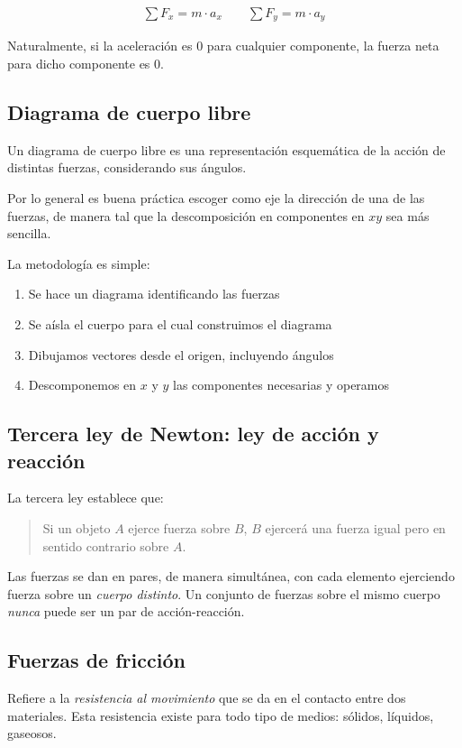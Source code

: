 \begin{align*}
    \sum F_x = m \cdot a_x \qquad \sum F_y = m \cdot a_y
\end{align*}

Naturalmente, si la aceleración es 0 para cualquier componente,
la fuerza neta para dicho componente es 0.

\subsection{Diagrama de cuerpo libre}

Un diagrama de cuerpo libre es una representación esquemática de la acción 
de distintas fuerzas, considerando sus ángulos.

Por lo general es buena práctica escoger como eje la dirección de una de las 
fuerzas, de manera tal que la descomposición en componentes en \(xy\) sea más 
sencilla.

La metodología es simple:
\begin{enumerate}
    \item Se hace un diagrama identificando las fuerzas
    \item Se aísla el cuerpo para el cual construimos el diagrama
    \item Dibujamos vectores desde el origen, incluyendo ángulos
    \item Descomponemos en \(x\) y \(y\) las componentes necesarias y operamos 
\end{enumerate}

\subsection{Tercera ley de Newton: ley de acción y reacción}

La tercera ley establece que:

\blockquote{
    Si un objeto \(A\) ejerce fuerza sobre \(B\),
    \(B\) ejercerá una fuerza igual pero en sentido contrario sobre \(A\).
}

Las fuerzas se dan en pares, de manera simultánea,
con cada elemento ejerciendo fuerza sobre un \textit{cuerpo distinto}.
Un conjunto de fuerzas sobre el mismo cuerpo \textit{nunca} puede ser un 
par de acción-reacción.

\subsection{Fuerzas de fricción}

Refiere a la \textit{resistencia al movimiento}
que se da en el contacto entre dos materiales.
Esta resistencia existe para todo tipo de medios: sólidos, líquidos, gaseosos.

